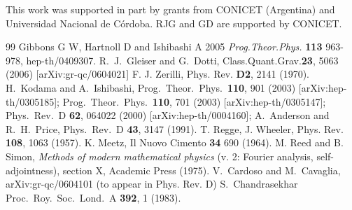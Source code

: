 \documentclass[aps,floats,showpacs,amssymb,tightenlines]{revtex4}
\begin{document}
This work was supported in part by grants from CONICET (Argentina)
and Universidad Nacional de C\'ordoba.  RJG and GD are supported by
CONICET.




\begin{thebibliography}{99}
 Gibbons G W, Hartnoll D and  Ishibashi A 2005 {\em Prog.Theor.Phys.}
{\bf 113} 963-978, hep-th/0409307.
R.~J.~Gleiser and G.~Dotti,
  Class.Quant.Grav.{\bf 23}, 5063 (2006) [arXiv:gr-qc/0604021]
 F. J.
Zerilli, Phys. Rev. {\bf D2}, 2141 (1970).
  H.~Kodama and A.~Ishibashi,
  Prog.\ Theor.\ Phys.\  {\bf 110}, 901 (2003)
  [arXiv:hep-th/0305185];
  Prog.\ Theor.\ Phys.\  {\bf 110}, 701 (2003)
  [arXiv:hep-th/0305147];
  Phys.\ Rev.\  D {\bf 62}, 064022 (2000)
  [arXiv:hep-th/0004160];
  A.~Anderson and R.~H.~Price,
  Phys.\ Rev.\  D {\bf 43}, 3147 (1991).
T. Regge, J. Wheeler, Phys. Rev. {\bf 108}, 1063 (1957).
K. Meetz, Il Nuovo Cimento {\bf 34} 690 (1964).
   M. Reed and B. Simon, {\em  Methods of modern mathematical physics} (v. 2: Fourier
  analysis, self-adjointness), section X,
  Academic Press (1975).
  V.~Cardoso and M.~Cavaglia,
  arXiv:gr-qc/0604101 (to appear in Phys. Rev. D)
  S.~Chandrasekhar
  Proc.\ Roy.\ Soc.\ Lond.\ A {\bf 392}, 1 (1983).
  



\end{thebibliography}
\end{document}
